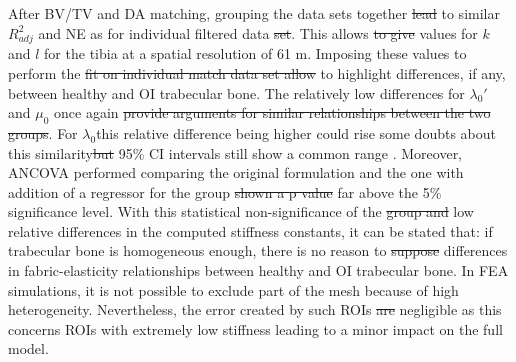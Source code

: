 \documentclass[a4paper,fleqn]{DC_ArtStyle}
\providecommand{\DIFadd}[1]{{\protect\color{blue}{#1}}} %
\providecommand{\DIFdel}[1]{{\protect\color{red}\sout{#1}}}                      %
\providecommand{\DIFaddbegin}{} %
\providecommand{\DIFaddend}{} %
\providecommand{\DIFdelbegin}{} %
\providecommand{\DIFdelend}{} %
\begin{document}
After BV/TV and DA matching, grouping the data sets together \DIFdelbegin \DIFdel{lead }\DIFdelend \DIFaddbegin \DIFadd{led }\DIFaddend to similar $R^2_{adj}$ and NE as for \DIFaddbegin \DIFadd{the }\DIFaddend individual filtered data \DIFdelbegin \DIFdel{set}\DIFdelend \DIFaddbegin \DIFadd{sets}\DIFaddend . This allows \DIFdelbegin \DIFdel{to give }\DIFdelend \DIFaddbegin \DIFadd{one to determine }\DIFaddend values for $k$ and $l$ for the tibia at a spatial resolution of 61 \si{\micro}m. Imposing these values to perform the \DIFdelbegin \DIFdel{fit on individual match data set allow }\DIFdelend \DIFaddbegin \DIFadd{linear regression on data sets of the matched individuals allows us }\DIFaddend to highlight differences, if any, between healthy and OI trabecular bone. The relatively low differences for $\lambda_0'$ and $\mu_0$ once again \DIFdelbegin \DIFdel{provide arguments for similar relationships between the two groups}\DIFdelend \DIFaddbegin \DIFadd{supports the hypothesis for similar fabric-elasticity relationships between healthy and OI trabecular bone}\DIFaddend . For $\lambda_0$\DIFaddbegin \DIFadd{, }\DIFaddend this relative difference being higher could rise some doubts about this similarity\DIFdelbegin \DIFdel{but }\DIFdelend \DIFaddbegin \DIFadd{, but the }\DIFaddend 95\% CI intervals still show a common range \DIFaddbegin \DIFadd{which almost include both the $\lambda_0$ of OI and healthy linear regressions}\DIFaddend . Moreover, ANCOVA performed comparing the original formulation and the one with addition of a regressor for the group \DIFdelbegin \DIFdel{shown a p value }\DIFdelend \DIFaddbegin \DIFadd{showed a p-value }\DIFaddend far above the 5\% significance level. With this statistical non-significance of the \DIFdelbegin \DIFdel{group and }\DIFdelend \DIFaddbegin \DIFadd{groups and their }\DIFaddend low relative differences in the computed stiffness constants, it can be stated that: if trabecular bone is homogeneous enough, there is no reason to \DIFdelbegin \DIFdel{suppose }\DIFdelend \DIFaddbegin \DIFadd{assume }\DIFaddend differences in fabric-elasticity relationships between healthy and OI trabecular bone. In FEA simulations, it is not possible to exclude part of the mesh because of high heterogeneity. Nevertheless, the error created by such ROIs \DIFdelbegin \DIFdel{are }\DIFdelend \DIFaddbegin \DIFadd{is }\DIFaddend negligible as this concerns ROIs with extremely low stiffness leading to a minor impact on the full model.\\
\end{document}
